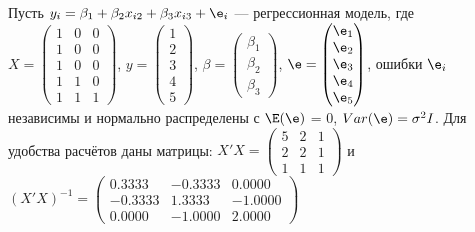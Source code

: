 \documentclass[pdftex,11pt,openany]{book}\usepackage[]{graphicx}\usepackage[]{color}
\begin{document}
\begin{problem}
Пусть $y_i = \beta_1 + \beta_2 x_{i2} + \beta_3 x_{i3} + \e_i$ --- регрессионная модель, где $X = \begin{pmatrix} 1 & 0 & 0 \\ 1 & 0 & 0 \\ 1 & 0 & 0 \\ 1 & 1 & 0 \\ 1 & 1 & 1 \end{pmatrix}$, $y = \begin{pmatrix} 1 \\ 2 \\ 3 \\ 4 \\ 5 \end{pmatrix}$, $\beta = \begin{pmatrix} \beta_1 \\ \beta_2 \\ \beta_3 \end{pmatrix}$, $\e = \begin{pmatrix} \e_1 \\ \e_2 \\ \e_3 \\ \e_4 \\ \e_5  \end{pmatrix}$, ошибки $\e_i$ независимы и нормально распределены с $\E(\e)$ = 0, $Var(\e) = \sigma^2 I$. Для удобства расчётов даны матрицы: $X'X = \begin{pmatrix} 5 & 2 & 1 \\ 2 & 2 & 1\\ 1 & 1 & 1 \end{pmatrix}$ и $(X'X)^{-1}= \begin{pmatrix} 0.3333 & -0.3333 & 0.0000 \\ -0.3333 & 1.3333 & -1.0000 \\ 0.0000 & -1.0000 & 2.0000 \end{pmatrix}$






\end{problem}
\end{document}
